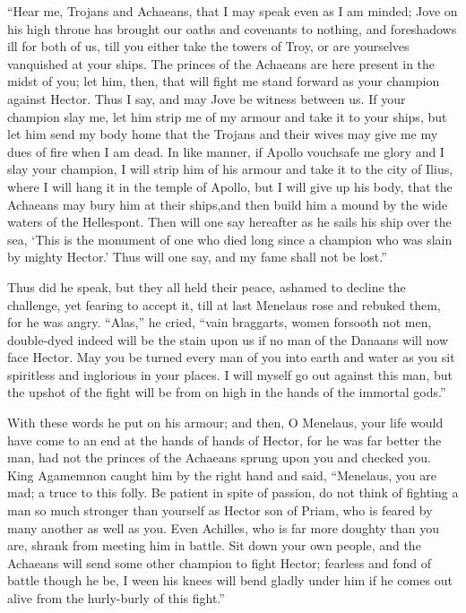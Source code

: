“Hear me, Trojans and Achaeans, that I may speak even as I am minded; Jove
on his high throne has brought our oaths and covenants to nothing, and
foreshadows ill for both of us, till you either take the towers of Troy,
or are yourselves vanquished at your ships. The princes of the Achaeans
are here present in the midst of you; let him, then, that will fight me
stand forward as your champion against Hector. Thus I say, and may Jove be
witness between us. If your champion slay me, let him strip me of my
armour and take it to your ships, but let him send my body home that the
Trojans and their wives may give me my dues of fire when I am dead. In
like manner, if Apollo vouchsafe me glory and I slay your champion, I will
strip him of his armour and take it to the city of Ilius, where I will
hang it in the temple of Apollo, but I will give up his body, that the
Achaeans may bury him at their ships,and then build him a mound by the
wide waters of the Hellespont. Then will one say hereafter as he sails his
ship over the sea, ‘This is the monument of one who died long since a
champion who was slain by mighty Hector.’ Thus will one say, and my fame
shall not be lost.”

Thus did he speak, but they all held their peace, ashamed to decline the
challenge, yet fearing to accept it, till at last Menelaus rose and
rebuked them, for he was angry. “Alas,” he cried, “vain braggarts, women
forsooth not men, double-dyed indeed will be the stain upon us if no man
of the Danaans will now face Hector. May you be turned every man of you
into earth and water as you sit spiritless and inglorious in your places.
I will myself go out against this man, but the upshot of the fight will be
from on high in the hands of the immortal gods.”

With these words he put on his armour; and then, O Menelaus, your life
would have come to an end at the hands of hands of Hector, for he was far
better the man, had not the princes of the Achaeans sprung upon you and
checked you. King Agamemnon caught him by the right hand and said,
“Menelaus, you are mad; a truce to this folly. Be patient in spite of
passion, do not think of fighting a man so much stronger than yourself as
Hector son of Priam, who is feared by many another as well as you. Even
Achilles, who is far more doughty than you are, shrank from meeting him in
battle. Sit down your own people, and the Achaeans will send some other
champion to fight Hector; fearless and fond of battle though he be, I ween
his knees will bend gladly under him if he comes out alive from the
hurly-burly of this fight.”

